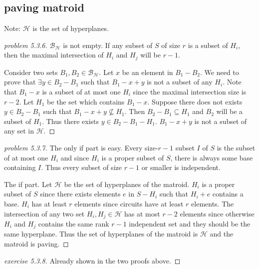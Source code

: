 \documentclass[12pt]{article}
\newcommand{\BH}{\mathcal{B}_{\mathcal H}}
\begin{document}
\subsection{paving matroid}
Note: $\mathcal H$ is the set of hyperplanes.
\begin{proof}[problem 5.3.6]
    $\BH$ is not empty. If any subset of $S$ of size $r$ is a subset of $H_i$, then the maximal intersection of $H_i$ and $H_j$ will be $r-1$.

    Consider two sets $B_1,B_2\in\BH$. Let $x$ be an element in $B_1-B_2$. We need to prove that $\exists y\in B_2-B_1$ such that $B_1-x+y$ is not a subset of any $H_i$. Note that $B_1-x$ is a subset of at most one $H_i$ since the maximal intersection size is $r-2$. Let $H_1$ be the set which contains $B_1-x$. Suppose there does not exists $y\in B_2-B_1$ such that $B_1-x+y\not\subseteq H_1$. Then $B_2-B_1\subseteq H_1$ and $B_2$ will be a subset of $H_1$. Thus there exists $y\in B_2-B_1-H_1$. $B_1-x+y$ is not a subset of any set in $\mathcal{H}$.
\end{proof}
\begin{proof}[problem 5.3.7]
    The only if part is easy. Every size-$r-1$ subset $I$ of $S$ is the subset of at most one $H_i$ and since $H_i$ is a proper subset of $S$, there is always some base containing $I$. Thus every subset of size $r-1$ or smaller is independent.
    
    The if part. Let $\mathcal{H}$ be the set of hyperplanes of the matroid. $H_i$ is a proper subset of $S$ since there exists elements $e$ in $S-H_i$ such that $H_i+e$ contains a base. $H_i$ has at least $r$ elements since circuits have at least $r$ elements. The intersection of any two set $H_i,H_j\in \mathcal{H}$ has at most $r-2$ elements since otherwise $H_i$ and $H_j$ contains the same rank $r-1$ independent set and they should be the same hyperplane. Thus the set of hyperplanes of the matroid is $\mathcal{H}$ and the matroid is paving.
\end{proof}
\begin{proof}[exercise 5.3.8]
    Already shown in the two proofs above.
\end{proof}
\end{document}
